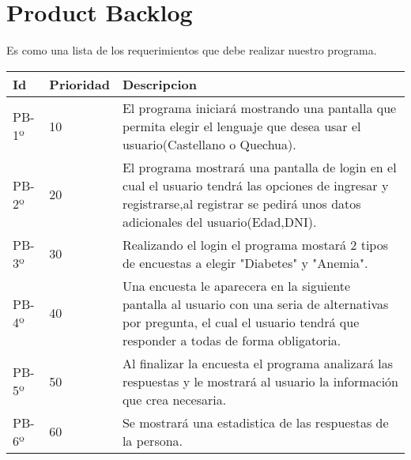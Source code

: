 \chapter{Product Backlog}
Es como una lista de los requerimientos que debe realizar nuestro programa.

\begin{table}[htbp]
	\begin{center}
		\begin{tabular}{| p{2.1cm}| p{2.1cm} |p{8.2cm} |}
			\hline
			\textbf{Id} & \textbf {Prioridad} & \textbf{Descripcion} \\\hline    
			PB-1º & 10 & El programa iniciará mostrando una pantalla que permita elegir el lenguaje que desea usar el usuario(Castellano o Quechua).\\ \hline
			PB-2º & 20 & El programa mostrará una pantalla de login en el cual el usuario tendrá las opciones de ingresar y registrarse,al registrar se pedirá unos datos adicionales del usuario(Edad,DNI).\\ \hline
			PB-3º & 30 & Realizando el login el programa mostará 2 tipos de encuestas a elegir "Diabetes" y "Anemia".\\ \hline
			PB-4º & 40 & Una encuesta le aparecera en la siguiente pantalla al usuario con una seria de alternativas por pregunta, 
			el cual el usuario tendrá que responder a todas de forma obligatoria.\\ \hline
			PB-5º & 50 & Al finalizar la encuesta el programa analizará las respuestas y le mostrará al usuario la información que crea necesaria.\\ \hline
			PB-6º & 60 & Se mostrará una estadistica de las respuestas de la persona.\\ \hline
		\end{tabular}
	\end{center}
\end{table}


